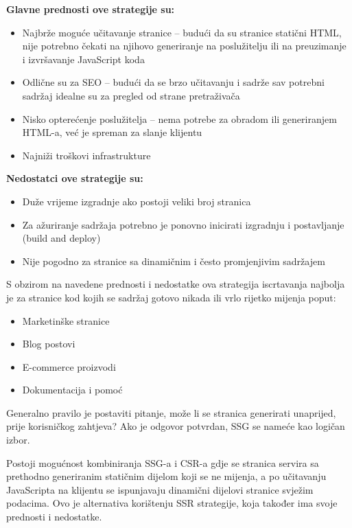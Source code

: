 \bigskip
\textbf{Glavne prednosti ove strategije su: \cite{moore2024rendering}}
\begin{itemize}
    \item Najbrže moguće učitavanje stranice – budući da su stranice statični HTML, nije potrebno čekati na njihovo generiranje na poslužitelju ili na preuzimanje i izvršavanje JavaScript koda
    \item Odlične su za SEO – budući da se brzo učitavanju i sadrže sav potrebni sadržaj idealne su za pregled od strane pretraživača
    \item Nisko opterećenje poslužitelja – nema potrebe za obradom ili generiranjem HTML-a, već je spreman za slanje klijentu
    \item Najniži troškovi infrastrukture
\end{itemize}

\bigskip

\textbf{Nedostatci ove strategije su:}

\begin{itemize}
    \item Duže vrijeme izgradnje ako postoji veliki broj stranica
    \item Za ažuriranje sadržaja potrebno je ponovno inicirati izgradnju i postavljanje (build and deploy)
    \item Nije pogodno za stranice sa dinamičnim i često promjenjivim sadržajem
\end{itemize}

S obzirom na navedene prednosti i nedostatke ova strategija iscrtavanja najbolja je za stranice kod kojih se sadržaj gotovo nikada ili vrlo rijetko mijenja poput:
\begin{itemize}
    \item Marketinške stranice
    \item Blog postovi
    \item E-commerce proizvodi
    \item Dokumentacija i pomoć
\end{itemize}
Generalno pravilo je postaviti pitanje, može li se stranica generirati unaprijed, prije korisničkog zahtjeva? Ako je odgovor potvrdan, SSG se nameće kao logičan izbor. \cite{nextjsssg}

Postoji mogućnost kombiniranja SSG-a i CSR-a gdje se stranica servira sa prethodno generiranim statičnim dijelom koji se ne mijenja, a po učitavanju JavaScripta na klijentu se ispunjavaju dinamični dijelovi stranice svježim podacima. Ovo je alternativa korištenju SSR strategije, koja također ima svoje prednosti i nedostatke. \cite{nextjsssg}

